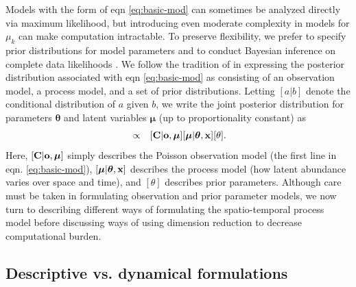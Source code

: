 \documentclass[times,mee,doublespace,]{besauth2}
\begin{document}
Models with the form of eqn \ref{eq:basic-mod} can sometimes be analyzed directly via maximum likelihood, but introducing even moderate complexity in models for $\mu_k$ can make computation intractable.  To preserve flexibility, we prefer to specify prior distributions for model parameters and to conduct Bayesian inference \citep[see e.g.][]{GelmanEtAl2004} on complete data likelihoods \citep{Dempster1977}.   We follow the tradition of \citet{Berliner1996} in expressing the posterior distribution associated with eqn \ref{eq:basic-mod} as consisting of an observation model, a process model, and a set of
prior distributions.  Letting $[a|b]$ denote the conditional distribution of $a$ given $b$, we write the joint posterior distribution for parameters $\boldsymbol{\theta}$ and latent variables $\boldsymbol{\mu}$ (up to proportionality constant) as
\begin{eqnarray}
  [\boldsymbol{\mu},\boldsymbol{\theta} | {\bf x},{\bf C},{\bf o}] & \propto & [{\bf C} | {\bf o}, \boldsymbol{\mu}] [\boldsymbol{\mu} | \boldsymbol{\theta},{\bf x}] [\theta].
  \label{eq:hmod}
\end{eqnarray}
Here, $[{\bf C} | {\bf o}, \boldsymbol{\mu}]$ simply describes the Poisson observation model (the first line in eqn. \ref{eq:basic-mod}), $[\boldsymbol{\mu} | \boldsymbol{\theta},{\bf x}]$ describes the process model (how latent abundance varies over space and time), and $[\theta]$ describes prior parameters.  Although care must be taken in formulating observation and prior parameter models, we now turn to describing different ways of formulating the spatio-temporal process model before discussing ways of using dimension reduction to decrease computational burden.

\subsection{Descriptive vs. dynamical formulations}
\end{document}
